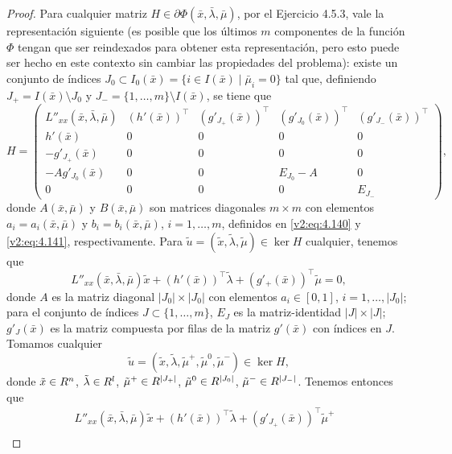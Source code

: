 \begin{proof}
    Para cualquier matriz $H \in \partial \Phi(\bar{x}, \bar{\lambda}, \bar{\mu})$, por el Ejercicio 4.5.3, vale la representación siguiente (es posible que los últimos $m$ componentes de la función $\Phi$ tengan que ser reindexados para obtener esta representación, pero esto puede ser hecho en este contexto sin cambiar las propiedades del problema): existe un conjunto de índices $J_0 \subset I_0(\bar{x}) = \{i \in I(\bar{x}) \mid \bar{\mu}_i = 0\}$ tal que, definiendo $J_+ = I(\bar{x}) \setminus J_0$ y $J_- = \{1, \dots, m\} \setminus I(\bar{x})$, se tiene que
    \[
        H = \begin{pmatrix} L''_{xx}(\bar{x}, \bar{\lambda}, \bar{\mu}) & (h'(\bar{x}))^\top & (g'_{J_+}(\bar{x}))^\top & (g'_{J_0}(\bar{x}))^\top & (g'_{J_-}(\bar{x}))^\top \\
        h'(\bar{x}) & 0 & 0 & 0 & 0 \\
        -g'_{J_+}(\bar{x}) & 0 & 0 & 0 & 0 \\
        -A g'_{J_0}(\bar{x}) & 0 & 0 & E_{J_0} - A & 0 \\
        0 & 0 & 0 & 0 & E_{J_-} \end{pmatrix},
    \]
    donde $A(\bar{x}, \bar{\mu})$ y $B(\bar{x}, \bar{\mu})$ son matrices diagonales $m \times m$ con elementos $a_i = a_i(\bar{x}, \bar{\mu})$ y $b_i = b_i(\bar{x}, \bar{\mu})$, $i = 1, \dots, m$, definidos en \eqref{v2:eq:4.140} y \eqref{v2:eq:4.141}, respectivamente.
    Para $\tilde{u} = (\tilde{x}, \tilde{\lambda}, \tilde{\mu}) \in \ker H$ cualquier, tenemos que
    \begin{equation}
        L''_{xx}(\bar{x}, \bar{\lambda}, \bar{\mu})\tilde{x} + (h'(\bar{x}))^\top\tilde{\lambda} + (g'_+(\bar{x}))^\top\tilde{\mu} = 0,
        \label{v2:eq:4.153}
    \end{equation}
    donde $A$ es la matriz diagonal $|J_0| \times |J_0|$ con elementos $a_i \in [0, 1]$, $i = 1, \dots, |J_0|$; para el conjunto de índices $J \subset \{1, \dots, m\}$, $E_J$ es la matriz-identidad $|J| \times |J|$; $g'_J(\bar{x})$ es la matriz compuesta por filas de la matriz $g'(\bar{x})$ con índices en $J$.
    Tomamos cualquier
    \[
        \tilde{u} = (\tilde{x}, \tilde{\lambda}, \tilde{\mu}^+, \tilde{\mu}^0, \tilde{\mu}^-) \in \ker H,
    \]
    donde $\tilde{x} \in R^n$, $\tilde{\lambda} \in R^l$, $\tilde{\mu}^+ \in R^{|J_+|}$, $\tilde{\mu}^0 \in R^{|J_0|}$, $\tilde{\mu}^- \in R^{|J_-|}$. Tenemos entonces que
    \begin{align}
        L''_{xx}(\bar{x}, \bar{\lambda}, \bar{\mu})\tilde{x} + (h'(\bar{x}))^\top \tilde{\lambda} + (g'_{J_+}(\bar{x}))^\top \tilde{\mu}^+ & \nonumber \\

\end{align}
\end{proof}
